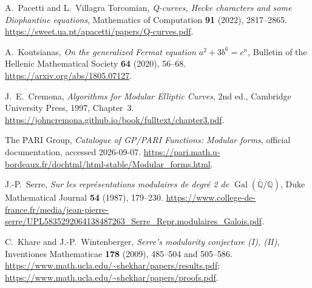A.~Pacetti and L.~Villagra Torcomian,
\emph{Q-curves, Hecke characters and some Diophantine equations},
Mathematics of Computation \textbf{91} (2022), 2817--2865.
\url{https://sweet.ua.pt/apacetti/papers/Q-curves.pdf}.

A.~Koutsianas,
\emph{On the generalized Fermat equation $a^2+3b^6=c^n$},
Bulletin of the Hellenic Mathematical Society \textbf{64} (2020), 56--68.
\url{https://arxiv.org/abs/1805.07127}.

J.~E.~Cremona,
\emph{Algorithms for Modular Elliptic Curves}, 2nd ed.,
Cambridge University Press, 1997, Chapter~3.
\url{https://johncremona.github.io/book/fulltext/chapter3.pdf}.

The PARI Group,
\emph{Catalogue of GP/PARI Functions: Modular forms},
official documentation, accessed 2026-09-07.
\url{https://pari.math.u-bordeaux.fr/dochtml/html-stable/Modular_forms.html}.

J.-P.~Serre,
\emph{Sur les repr\'esentations modulaires de degr\'e 2 de
$\operatorname{Gal}(\overline{\mathbb Q}/\mathbb Q)$},
Duke Mathematical Journal \textbf{54} (1987), 179--230.
\url{https://www.college-de-france.fr/media/jean-pierre-serre/UPL5835292064138487263_Serre_Repr.modulaires_Galois.pdf}.

C.~Khare and J.-P.~Wintenberger,
\emph{Serre's modularity conjecture (I), (II)},
Inventiones Mathematicae \textbf{178} (2009), 485--504 and 505--586.
\url{https://www.math.ucla.edu/~shekhar/papers/results.pdf};
\url{https://www.math.ucla.edu/~shekhar/papers/proofs.pdf}.
